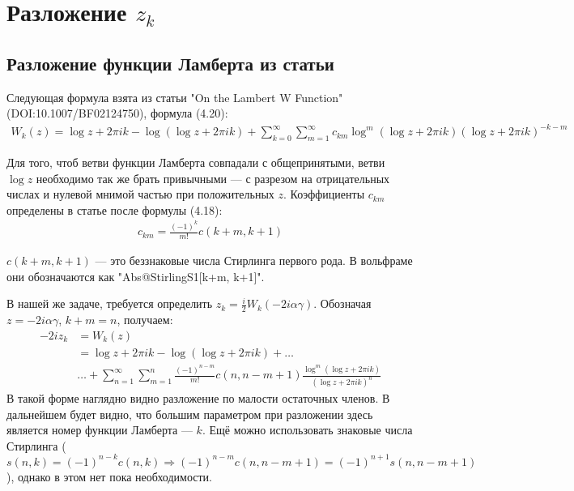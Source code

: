 \documentclass[a4paper, 12pt]{article}
\author{Нугманов Булат}
\begin{document}
\section*{Разложение $z_k$}
\subsection*{Разложение функции Ламберта из статьи}
Следующая формула взята из статьи "On the Lambert W Function"(DOI:10.1007/BF02124750), формула (4.20):
\begin{equation}
\begin{aligned}
    W_k(z) = \log z + 2\pi i k - \log\left(\log z + 2\pi i k\right) + \sum\limits_{k=0}^{\infty}\sum\limits_{m=1}^{\infty} c_{km}\log^m\left(\log z + 2\pi i k\right)\left(\log z + 2\pi i k \right)^{-k-m}
\end{aligned}
\end{equation}

Для того, чтоб ветви функции Ламберта совпадали с общепринятыми, ветви $\log z$ необходимо так же брать привычными --- с разрезом на отрицательных числах и нулевой мнимой частью при положительных $z$. Коэффициенты $c_{km}$ определены в статье после формулы (4.18):
\begin{equation}
\begin{aligned}
    c_{km} = \frac{(-1)^k}{m!} c(k+m, k+1)
\end{aligned}
\end{equation}

$c(k+m, k+1)$ --- это беззнаковые числа Стирлинга первого рода. В вольфраме они обозначаются как "Abs@StirlingS1[k+m, k+1]".

В нашей же задаче, требуется определить $z_k = \frac{i}{2}W_k(-2i\alpha\gamma)$. Обозначая $z=-2i\alpha\gamma$, $k+m=n$, получаем:
\begin{equation}
\begin{aligned}
    -2iz_k &= W_k(z) \\
    &= \log z + 2\pi i k - \log\left(\log z + 2\pi i k\right) + \dots \\
    &\dots + \sum\limits_{n=1}^{\infty}\sum\limits_{m=1}^{n} 
    \frac{(-1)^{n-m}}{m!} c(n, n-m+1)\frac{\log^{m}\left(\log z + 2\pi i k\right)}{\left(\log z + 2\pi i k\right)^n}
\end{aligned}
\end{equation}
В такой форме наглядно видно разложение по малости остаточных членов. В дальнейшем будет видно, что большим параметром при разложении здесь является номер функции Ламберта --- $k$. Ещё можно использовать знаковые числа Стирлинга ($s(n, k) = (-1)^{n-k}c(n, k) \Rightarrow (-1)^{n-m} c(n, n-m+1) = (-1)^{n+1} s(n, n-m+1)$), однако в этом нет пока необходимости.
\end{document}
